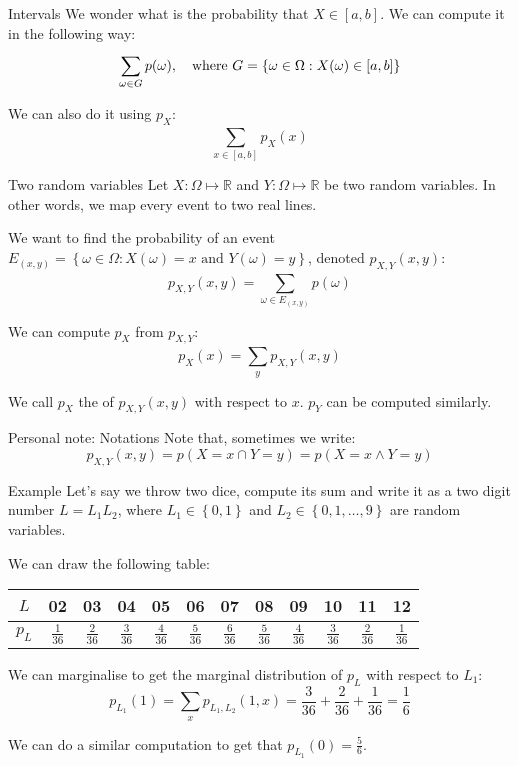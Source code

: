 \documentclass[a4paper]{article}
\begin{document}
\begin{parag}{Intervals}
    We wonder what is the probability that $X \in \left[a, b\right]$. We can compute it in the following way:
    \[\sum_{\omega \in G}^{} p\left(\omega\right), \mathspace \text{where } G = \left\{\omega \in \Omega : X\left(\omega\right) \in \left[a, b\right]\right\}\]

    We can also do it using $p_X$:
    \[\sum_{x \in\left[a, b\right]}^{} p_X\left(x\right)\]
\end{parag}

\begin{parag}{Two random variables}
    Let $X : \Omega \mapsto \mathbb{R}$ and $Y : \Omega \mapsto \mathbb{R}$ be two random variables. In other words, we map every event to two real lines.

    We want to find the probability of an event $E_{\left(x, y\right)} = \left\{\omega \in \Omega : X\left(\omega\right) = x \text{ and } Y\left(\omega\right) = y\right\}$, denoted $p_{X, Y}\left(x, y\right)$:
    \[p_{X, Y}\left(x, y\right) = \sum_{\omega \in E_{\left(x, y\right)}}^{} p\left(\omega\right)\]

    We can compute $p_X$ from $p_{X, Y}$:
    \[p_X\left(x\right) = \sum_{y}^{} p_{X, Y}\left(x, y\right)\]

    We call $p_X$ the  of $p_{X, Y}\left(x, y\right)$ with respect to $x$. $p_Y$ can be computed similarly.

    \begin{subparag}{Personal note: Notations}
        Note that, sometimes we write:
        \[p_{X, Y}\left(x, y\right) = p\left(X = x \cap Y = y\right) = p\left(X = x \land Y = y\right)\]
    \end{subparag}
\end{parag}

\begin{parag}{Example}
    Let's say we throw two dice, compute its sum and write it as a two digit number $L = L_1 L_2$, where $L_1 \in \left\{0, 1\right\}$ and $L_2 \in \left\{0, 1, \ldots, 9\right\}$ are random variables.

    We can draw the following table:
    \begin{center}
    \begin{tabular}{c|c|c|c|c|c|c|c|c|c|c|c}
        $L$ & 02 & 03 & 04 & 05 & 06 & 07 & 08 & 09 & 10 & 11 & 12  \\
        \hline
        $p_L$ & $\frac{1}{36}$ & $\frac{2}{36}$ & $\frac{3}{36}$ & $\frac{4}{36}$ & $\frac{5}{36}$ & $\frac{6}{36}$ & $\frac{5}{36}$ & $\frac{4}{36}$ & $\frac{3}{36}$ & $\frac{2}{36}$ & $\frac{1}{36}$
    \end{tabular}
    \end{center}

    We can marginalise to get the marginal distribution of $p_L$ with respect to $L_1$:
    \[p_{L_1}\left(1\right) = \sum_{x}^{} p_{L_1, L_2}\left(1, x\right) = \frac{3}{36} + \frac{2}{36} + \frac{1}{36} = \frac{1}{6}\]

    We can do a similar computation to get that $p_{L_1}\left(0\right) = \frac{5}{6}$.
\end{parag}
\end{document}
